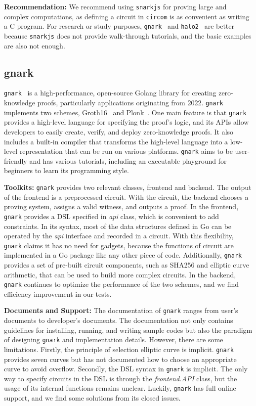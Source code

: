 \documentclass[letterpaper,twocolumn,10pt]{article}
\theoremstyle{definition}
\newcommand{\mypara}[1]{\noindent\textbf{{#1: }}}
\newcommand{\zk}{\text{zk-SNARK}\xspace}
\newcommand{\new}[1]{{#1}\xspace}
\newcommand{\lib}[1]{\texttt{#1}\xspace}
\begin{document}
\mypara{Recommendation} We recommend using \lib{snarkjs} for proving large and complex computations, as defining a circuit in \texttt{circom} is as convenient as writing a C program. For research or study purposes, \lib{gnark}~\cite{gnark} and \lib{halo2}~\cite{halo2} are better because \lib{snarkjs} does not provide walk-through tutorials, and the basic examples are also not enough.

\subsection{gnark}
\lib{gnark}~\cite{gnark} is a high-performance, open-source Golang library for creating zero-knowledge proofs, particularly \zk applications originating from 2022. \lib{gnark} implements two schemes, Groth16~\cite{groth2016size} and Plonk~\cite{gabizon2019plonk}. One main feature is that \lib{gnark} provides a high-level language for specifying the proof's logic, and its APIs allow developers to easily create, verify, and deploy zero-knowledge proofs. It also includes a built-in compiler that transforms the high-level language into a low-level representation that can be run on various platforms. \lib{gnark} aims to be user-friendly and has various tutorials, including an executable playground for beginners to learn its programming style.

\mypara{Toolkits} \lib{gnark} provides two relevant classes, frontend and backend. The output of the frontend is a preprocessed circuit. With the circuit, the backend chooses a proving system, assigns a valid witness, and outputs a proof. In the frontend, \lib{gnark} provides a DSL specified in \textit{api} class, which is convenient to add constraints. \new{In its syntax, most of the data structures defined in Go can be operated by the \textit{api} interface and recorded in a circuit. With this flexibility, \lib{gnark} claims it has no need for gadgets, because the functions of circuit are implemented in a Go package like any other piece of code.}
Additionally, \lib{gnark} provides a set of pre-built circuit components, such as SHA256 and elliptic curve arithmetic, that can be used to build more complex circuits. In the backend, \lib{gnark} continues to optimize the performance of the two schemes, and we find efficiency improvement in our tests.

\mypara{Documents and Support} The documentation of \lib{gnark} ranges from user's documents to developer's documents. The documentation not only contains guidelines for installing, running, and writing sample codes but also the paradigm of designing \lib{gnark} and implementation details. However, there are some limitations. Firstly, the principle of selection elliptic curve is implicit. \lib{gnark} provides seven curves but has not documented how to choose an appropriate curve to avoid overflow. Secondly, the DSL syntax in \lib{gnark} is implicit. The only way to specify circuits in the DSL is through the \textit{frontend.API} class, but the usage of its internal functions remains unclear. Luckily, \lib{gnark} has full online support, and we find some solutions from its closed issues.
\end{document}

